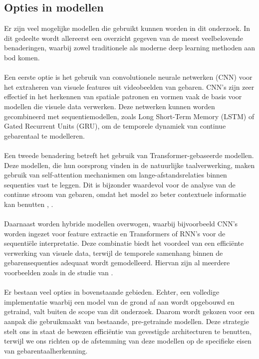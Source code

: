 \subsection{Opties in modellen}
Er zijn veel mogelijke modellen die gebruikt kunnen worden in dit onderzoek. 
In dit gedeelte wordt allereerst een overzicht gegeven van de meest veelbelovende benaderingen, waarbij zowel traditionele als moderne deep learning methoden aan bod komen.
\\
\\
Een eerste optie is het gebruik van convolutionele neurale netwerken (CNN) voor het extraheren van visuele features uit videobeelden van gebaren. 
CNN's zijn zeer effectief in het herkennen van spatiale patronen en vormen vaak de basis voor modellen die visuele data verwerken\autocite{farahat2022novelfeaturescramblingapproachreveals}. 
Deze netwerken kunnen worden gecombineerd met sequentiemodellen, zoals Long Short-Term Memory (LSTM) of Gated Recurrent Units (GRU), om de temporele dynamiek van continue gebarentaal te modelleren\autocite{electronics13071229}.
\\
\\
Een tweede benadering betreft het gebruik van Transformer-gebaseerde modellen. 
Deze modellen, die hun oorsprong vinden in de natuurlijke taalverwerking, maken gebruik van self-attention mechanismen om lange-afstandsrelaties binnen sequenties vast te leggen. 
Dit is bijzonder waardevol voor de analyse van de continue stroom van gebaren, omdat het model zo beter contextuele informatie kan benutten \autocite{vaswani2017attentionneed}, \autocite{DU2022115}.
\\
\\
Daarnaast worden hybride modellen overwogen, waarbij bijvoorbeeld CNN's worden ingezet voor feature extractie en Transformers of RNN's voor de sequentiële interpretatie. 
Deze combinatie biedt het voordeel van een efficiënte verwerking van visuele data, terwijl de temporele samenhang binnen de gebarensequenties adequaat wordt gemodelleerd.
Hiervan zijn al meerdere voorbeelden zoals in de studie van \textcite{Wang2022}.
\\
\\
Er bestaan veel opties in bovenstaande gebieden. 
Echter, een volledige implementatie waarbij een model van de grond af aan wordt opgebouwd en getraind, valt buiten de scope van dit onderzoek. 
Daarom wordt gekozen voor een aanpak die gebruikmaakt van bestaande, pre-getrainde modellen. 
Deze strategie stelt ons in staat de bewezen efficiëntie van gevestigde architecturen te benutten, terwijl we ons richten op de afstemming van deze modellen op de specifieke eisen van gebarentaalherkenning.
\\
\\
